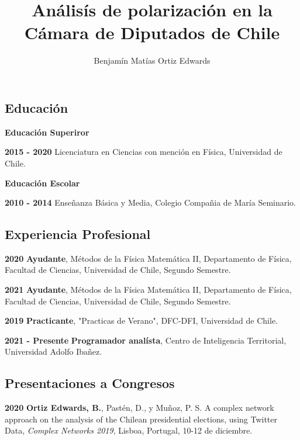 \documentclass{proyectotesis}
\title{Análisís de polarización en la Cámara de Diputados de Chile}
\author{Benjamín Matías Ortiz Edwards}
\begin{document}
\maketitlepage
\makepersonalinfo

\subsection{Educación}
\begin{cvlist}{}
\item[\textbf{Educación Superiror}] 
\item[\textbf{2015 - 2020}] Licenciatura en Ciencias con mención en Física, Universidad de Chile.
\item[\bf Educación Escolar]
\item[\textbf{2010 - 2014}]  Enseñanza Básica y Media, Colegio Compañia de María Seminario.
\end{cvlist}

\subsection{Experiencia Profesional}
\begin{cvlist}{}
\item[\textbf{2020}]   \textbf{Ayudante},  Métodos de la Física Matemática II, Departamento de Física, Facultad de Ciencias, Universidad de Chile, Segundo Semestre.
\item[\textbf{2021}]   \textbf{Ayudante},  Métodos de la Física Matemática II, Departamento de Física, Facultad de Ciencias, Universidad de Chile, Segundo Semestre.
\item[\textbf{2019}]  \textbf{Practicante}, "Practicas de Verano", DFC-DFI, Universidad de Chile.   
\item[\textbf{2021 - Presente}] \textbf{Programador analísta}, Centro de Inteligencia Territorial, Universidad Adolfo Ibañez. 

\end{cvlist}

\subsection{Presentaciones a Congresos}

\begin{cvlist}{}
\item[\textbf{2020}] \textbf{Ortiz Edwards, B.}, Pastén, D., y Muñoz, P. S. A complex network approach on the analysis of the Chilean presidential elections, using Twitter Data, {\it Complex Networks 2019}, Lisboa, Portugal, 10-12 de diciembre.

\end{cvlist}
\end{document}
